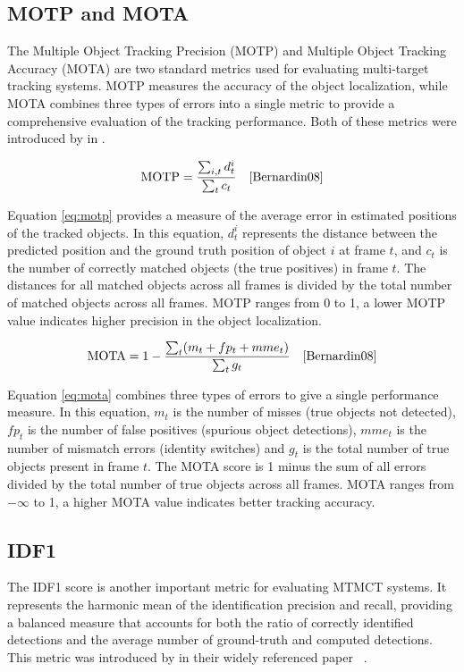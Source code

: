 \subsection{MOTP and MOTA}\label{subsec:motp_mota}
The Multiple Object Tracking Precision (MOTP) and Multiple Object Tracking Accuracy (MOTA) are two standard metrics used for evaluating multi-target tracking systems. MOTP measures the accuracy of the object localization, while MOTA combines three types of errors into a single metric to provide a comprehensive evaluation of the tracking performance. Both of these metrics were introduced by \textcite{Bernardin08} in \citeyear{Bernardin08}.

\begin{equation}
    \label{eq:motp}
    \text{MOTP}=\frac{\sum_{i, t} d_t^i}{\sum_t c_t}
    \quad\text{\cite[Eq.~1]{Bernardin08}}
\end{equation}

Equation \ref{eq:motp} provides a measure of the average error in estimated positions of the tracked objects. In this equation, \(d_t^i\) represents the distance between the predicted position and the ground truth position of object \(i\) at frame \(t\), and \(c_t\) is the number of correctly matched objects (the true positives) in frame \(t\). The distances for all matched objects across all frames is divided by the total number of matched objects across all frames. MOTP ranges from 0 to 1, a lower MOTP value indicates higher precision in the object localization.

\begin{equation}
    \label{eq:mota}
    \text{MOTA}=1-\frac{\sum_t (m_t+fp_t+mme_t)}{\sum_t g_t}
    \quad\text{\cite[Eq.~2]{Bernardin08}}
\end{equation}

Equation \ref{eq:mota} combines three types of errors to give a single performance measure. In this equation, \(m_t\) is the number of misses (true objects not detected), \(fp_t\) is the number of false positives (spurious object detections), \(mme_t\) is the number of mismatch errors (identity switches) and \(g_t\) is the total number of true objects present in frame \(t\). The MOTA score is 1 minus the sum of all errors divided by the total number of true objects across all frames. MOTA ranges from \(-\infty\) to 1, a higher MOTA value indicates better tracking accuracy.

\subsection{IDF1}\label{subsec:idf1}
The IDF1 score is another important metric for evaluating MTMCT systems. It represents the harmonic mean of the identification precision and recall, providing a balanced measure that accounts for both the ratio of correctly identified detections and the average number of ground-truth and computed detections. This metric was introduced by \citeauthor{Ristani16} in their widely referenced paper ~\cite{Ristani16}.

